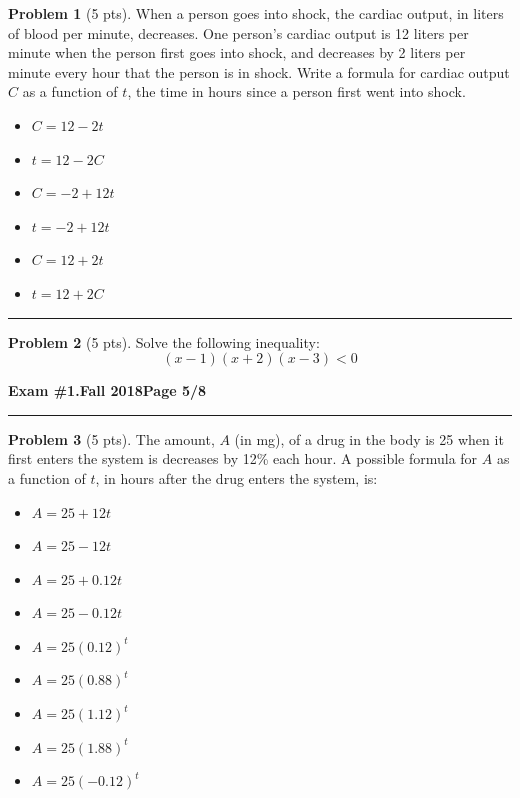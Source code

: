 \documentclass[12pt]{article}
\makeatletter
\theoremstyle{definition}
\newtheorem{problem}{Problem}
\newcommand*{\radiobutton}{%
  \@ifstar{\@radiobutton0}{\@radiobutton1}%
}
\newcommand*{\@radiobutton}[1]{%
  \begin{tikzpicture}
    \pgfmathsetlengthmacro\radius{height("X")/2}
    \draw[radius=\radius] circle;
    \ifcase#1 \fill[radius=.6*\radius] circle;\fi
  \end{tikzpicture}%
}
\makeatother
\begin{document}
\begin{problem}[5 pts]
  When a person goes into shock, the cardiac output, in liters of blood per minute, decreases. One person’s cardiac output
  is 12 liters per minute when the person first goes into shock, and decreases by 2 liters per minute every hour that the
  person is in shock. Write a formula for cardiac output $C$ as a function of $t$, the time in hours since a person first
  went into shock. 
  \begin{itemize}
  \item[\radiobutton] $C = 12 - 2t$
  \item[\radiobutton] $t = 12 - 2C$
  \item[\radiobutton] $C = -2 + 12t$
  \item[\radiobutton] $t = -2 + 12t$
  \item[\radiobutton] $C = 12 + 2t$
  \item[\radiobutton] $t = 12 + 2C$
  \end{itemize}
\end{problem}
\hrule

\begin{problem}[5 pts]
  Solve the following inequality:
  \begin{equation*} (x-1)(x+2)(x-3) < 0 \end{equation*}
\end{problem}

\newpage

\hfill{\large\bf Exam \#1.}\hfill{\large\bf  Fall 2018}\hfill{\large\bf Page 5/8}\hrule

\bigskip

\begin{problem}[5 pts]
  The amount, $A$ (in mg), of a drug in the body is 25 when it first enters the system is decreases by 12\% each hour. A
  possible formula for $A$ as a function of $t$, in hours after the drug enters the system, is: 
  \begin{itemize}
  \item[\radiobutton] $A= 25+12t$
  \item[\radiobutton] $A=25-12t$
  \item[\radiobutton] $A=25+0.12t$
  \item[\radiobutton] $A=25-0.12t$
  \item[\radiobutton] $A=25(0.12)^t$
  \item[\radiobutton] $A=25(0.88)^t$
  \item[\radiobutton] $A=25(1.12)^t$
  \item[\radiobutton] $A=25(1.88)^t$
  \item[\radiobutton] $A=25(-0.12)^t$
  \end{itemize}
\end{problem}
\end{document}

